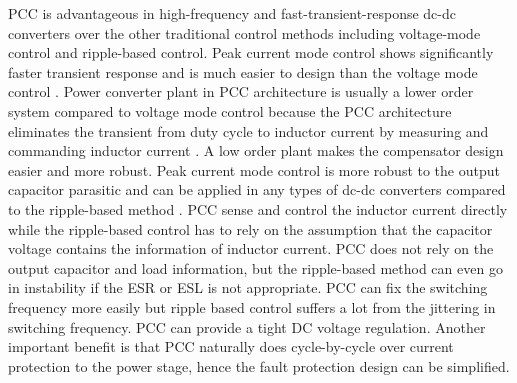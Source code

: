 PCC is advantageous in high-frequency and fast-transient-response dc-dc converters over the other traditional control methods including voltage-mode control and ripple-based control. Peak current mode control shows significantly faster transient response and is much easier to design than the voltage mode control \cite{erikson2007}. Power converter plant in PCC architecture is usually a lower order system compared to voltage mode control because the PCC architecture eliminates the transient from duty cycle to inductor current by measuring and commanding inductor current \cite{Bram2015tpel}. A low order plant makes the compensator design easier and more robust. Peak current mode control is more robust to the output capacitor parasitic and can be applied in any types of dc-dc converters compared to the ripple-based method \cite{Redljian2009tpel}. PCC sense and control the inductor current directly while the ripple-based control has to rely on the assumption that the capacitor voltage contains the information of inductor current. PCC does not rely on the output capacitor and load information, but the ripple-based method can even go in instability if the ESR or ESL is not appropriate. PCC can fix the switching frequency more easily but ripple based control suffers a lot from the jittering in switching frequency. PCC can provide a tight DC voltage regulation. Another important benefit is that PCC naturally does cycle-by-cycle over current protection to the power stage, hence the fault protection design can be simplified. 

